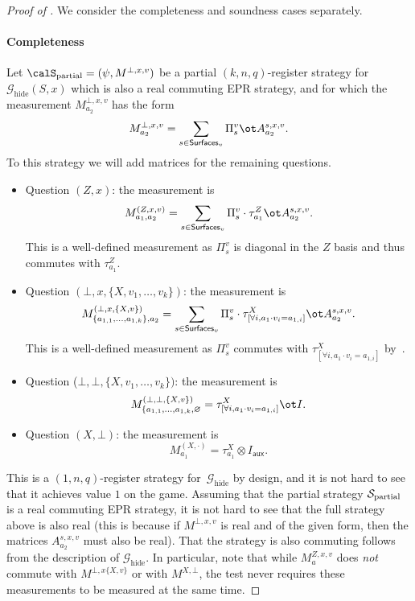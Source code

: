 \documentclass[11pt]{article}
\newcommand{\game}{\mathscr{G}}
\newcommand{\reg}[1]{{\mathsf{#1}}}
\newcommand{\surfaces}[1]{\mathsf{Surfaces}_{#1}}
\begin{document}
\begin{proof}[Proof of ]
  We consider the completeness and soundness cases separately.
  \paragraph{Completeness}
  Let $\calS_{\mathrm{partial}} = (\psi, M^{\bot, x,v})$ be a partial
  $(k,n,q)$-register strategy for~$\game_{\mathrm{hide}}(S,x)$ which is also a real commuting EPR strategy, and for which
  the measurement $M^{\bot, x,v}_{a_2}$ has the form
  \[ M^{\bot, x,v}_{a_2} = \sum_{s \in \surfaces{v}} \Pi^{v}_s \ot A^{s,x,v}_{a_2} . \]
  To this strategy we will add matrices for the remaining questions.
  \begin{itemize}
  \item[$\circ$] Question $(Z, x)$: the measurement is
    \[ M^{(Z,x,v)}_{a_1, a_2} = \sum_{s \in \surfaces{v}} \Pi^{v}_s \cdot
      \tau^{Z}_{a_1} \ot A^{s,x,v}_{a_2}. \]
    This is a well-defined measurement as $\Pi^{v}_s$ is diagonal in the
    $Z$ basis and thus commutes with $\tau^Z_{a_1}$.
  \item[$\circ$] Question $(\bot, x, \{X, v_1, \dots, v_k\})$: the
    measurement is
    \[ M^{(\bot, x, \{X, v\})}_{\{a_{1,1}, \dots,
        a_{1,k}\}, a_2} = \sum_{s \in \surfaces{v}} \Pi^{v}_s \cdot
      \tau^{X}_{[\forall i, a_1 \cdot v_i = a_{1,i}]}  \ot
      A^{s,x,v}_{a_2}.\]
    This is a well-defined measurement as $\Pi^{v}_s$ commutes with
    $\tau^{X}_{[\forall i, a_1 \cdot v_i = a_{1,i}]}$
    by~.
  \item[$\circ$] Question ($\bot, \bot, \{X, v_1, \dots, v_k\})$: the
    measurement is
    \[ M^{(\bot, \bot, \{X, v\})}_{\{a_{1,1}, \dots, a_{1,k},
        \varnothing} = \tau^X_{[\forall i, a_1 \cdot v_i = a_{1,i}]}
      \ot I. \]
  \item[$\circ$] Question $(X, \bot)$: the measurement is
    \[ M^{(X, \cdot)}_{a_1} = \tau^{X}_{a_1} \otimes I_{\reg{aux}}. \]
  \end{itemize}
This is a $(1,n,q)$-register strategy for~$\game_{\mathrm{hide}}$ by
design, and it is not hard to see that it achieves value $1$ on the
game. Assuming that the partial strategy $\cal{S}_{\mathrm{partial}}$
is a real commuting EPR strategy, it is not hard to see that the full
strategy above is also real (this is because if $M^{\bot, x,v}$ is real and
of the given form, then the matrices $A^{s,x,v}_{a_2}$ must also be
real). That the strategy is also commuting follows from the
description of $\game_{\mathrm{hide}}$. In particular, note that while
$M^{Z,x,v}_a$ does \emph{not} commute with $M^{\bot, x \{X, v\}}$ or
with $M^{X, \bot}$, the test never requires these measurements to be measured at the same time.


\end{proof}
\end{document}
